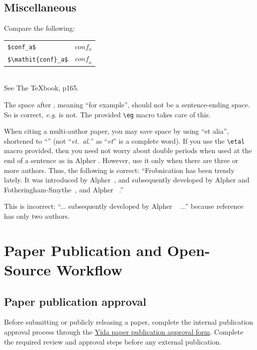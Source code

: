 \documentclass[10pt,twocolumn,letterpaper]{article}
\begin{document}
\subsection{Miscellaneous}

\noindent
Compare the following:\\
\begin{tabular}{ll}
 \verb'$conf_a$' &  $conf_a$ \\
 \verb'$\mathit{conf}_a$' & $\mathit{conf}_a$
\end{tabular}\\
See The \TeX book, p165.

The space after \eg, meaning ``for example'', should not be a sentence-ending space.
So \eg is correct, {\em e.g.} is not.
The provided \verb'\eg' macro takes care of this.

When citing a multi-author paper, you may save space by using ``et alia'', shortened to ``\etal'' (not ``{\em et.\ al.}'' as ``{\em et}'' is a complete word).
If you use the \verb'\etal' macro provided, then you need not worry about double periods when used at the end of a sentence as in Alpher \etal.
However, use it only when there are three or more authors.
Thus, the following is correct:
   ``Frobnication has been trendy lately.
   It was introduced by Alpher~\cite{Alpher02}, and subsequently developed by
   Alpher and Fotheringham-Smythe~\cite{Alpher03}, and Alpher \etal~\cite{Alpher04}.''

This is incorrect: ``... subsequently developed by Alpher \etal~\cite{Alpher03} ...'' because reference~\cite{Alpher03} has only two authors.

\section{Paper Publication and Open-Source Workflow}

\subsection{Paper publication approval}

Before submitting or publicly releasing a paper, complete the internal publication approval process through the \href{https://yida-group.alibaba-inc.com/APP_ZHVQTG6LH0I0BOSUJDQ8/workbench/FORM-82EC232FEEE9411BB171ECBA40FCD614T9QF?spm=ata.25287382.0.0.27147536laDwbn}{Yida paper publication approval form}. Complete the required review and approval steps before any external publication.
\end{document}
